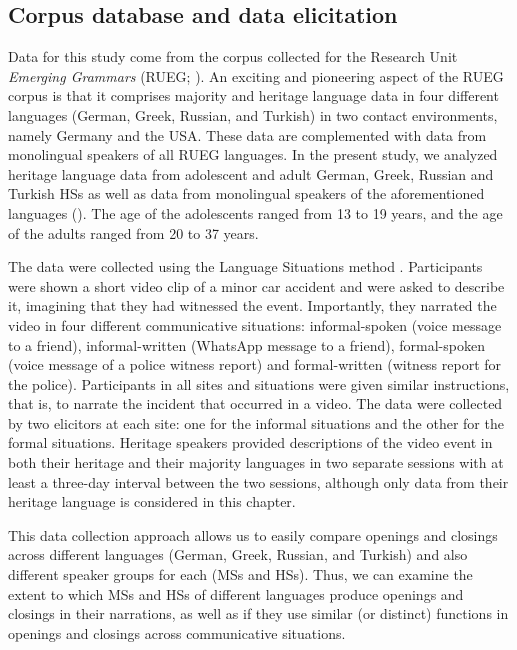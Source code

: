 \documentclass[output=paper,colorlinks,citecolor=brown]{langscibook}
\begin{document}
 \subsection{Corpus database and data elicitation}
 Data for this study come from the corpus collected for the Research Unit \textit{Emerging Grammars} (RUEG; \cite{wiese_heritage_2021}). An exciting and pioneering aspect of the RUEG corpus is that it comprises majority and heritage language data in four different languages (German, Greek, Russian, and Turkish) in two contact environments, namely Germany and the USA. These data are complemented with data from monolingual speakers of all RUEG languages. In the present study, we analyzed heritage language data from adolescent and adult German, Greek, Russian and Turkish HSs as well as data from monolingual speakers of the aforementioned languages (). The age of the adolescents ranged from 13 to 19 years, and the age of the adults ranged from 20 to 37 years.

 The data were collected using the Language Situations method \parencite{asahi_language_2019}. Participants were shown a short video clip of a minor car accident and were asked to describe it, imagining that they had witnessed the event. Importantly, they narrated the video in four different communicative situations: informal-spoken (voice message to a friend), informal-written (WhatsApp message to a friend), formal-spoken (voice message of a police witness report) and formal-written (witness report for the police). Participants in all sites and situations were given similar instructions, that is, to narrate the incident that occurred in a video. The data were collected by two elicitors at each site: one for the informal situations and the other for the formal situations. Heritage speakers provided descriptions of the video event in both their heritage and their majority languages in two separate sessions with at least a three-day interval between the two sessions, although only data from their heritage language is considered in this chapter.
 
 This data collection approach allows us to easily compare openings and closings across different languages (German, Greek, Russian, and Turkish) and also different speaker groups for each (MSs and HSs). Thus, we can examine the extent to which MSs and HSs of different languages produce openings and closings in their narrations, as well as if they use similar (or distinct) functions in openings and closings across communicative situations. 
 
\end{document}
